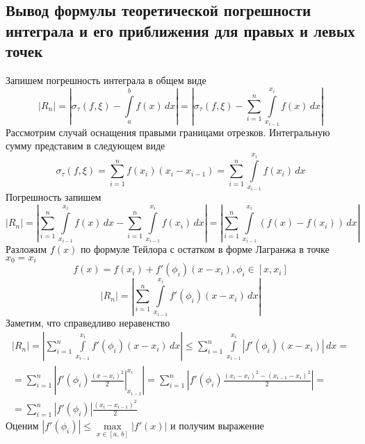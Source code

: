 \documentclass[a5paper, 10pt]{article}
\theoremstyle{definition}
\theoremstyle{plain}
\theoremstyle{remark}
\begin{document}
 \subsection{Вывод формулы теоретической погрешности интеграла и его приближения для правых и левых точек}
Запишем погрешность интеграла в общем виде
\begin{equation}
\left|R_n\right| = \left| \sigma_\tau (f, \xi) - \int\limits_a^b f(x) \,dx \right| =  \left| \sigma_{\tau} (f, \xi) - \sum\limits_{i=1}^n \int\limits_{x_{i-1}}^{x_{i}} f(x) \,dx \right|
\end{equation}
Рассмотрим случай оснащения правыми границами отрезков. Интегральную сумму представим в следующем виде
\begin{equation}
\sigma_\tau (f, \xi) = \sum\limits_{i=1}^n f(x_{i})(x_{i} - x_{i-1}) = \sum\limits_{i=1}^n \int\limits_{x_{i-1}}^{x_{i}} f(x_{i}) \,dx 
\end{equation}
Погрешность запишем 
\begin{equation}
\left|R_n\right| = \left|\sum\limits_{i=1}^n \int\limits_{x_{i-1}}^{x_{i}} f(x) \,dx - \sum\limits_{i=1}^n \int\limits_{x_{i-1}}^{x_{i}} f(x_{i}) \,dx \right| = \left|\sum\limits_{i=1}^n \int\limits_{x_{i-1}}^{x_{i}} \left( f(x) -  f(x_{i}) \right) \,dx\right|
\end{equation}
Разложим $f(x)$ по формуле Тейлора с остатком в форме Лагранжа в точке $x_0 = x_{i} $
\begin{equation}
f(x) = f(x_{i}) + f'(\phi_i)(x - x_{i}), \phi_i \in [x,  x_i ]
\end{equation}
\begin{equation}
\left|R_n\right| =  \left|\sum\limits_{i=1}^n \int\limits_{x_{i-1}}^{x_{i}}  f'(\phi_i)(x - x_{i})  \,dx\right|
\end{equation}
Заметим, что справедливо неравенство
\begin{multline}
\left|R_n\right| = \left|\sum\limits_{i=1}^n \int\limits_{x_{i-1}}^{x_{i}}  f'(\phi_i)(x - x_{i})  \,dx\right| \leqslant  \sum\limits_{i=1}^n \int\limits_{x_{i-1}}^{x_{i}} \left| f'(\phi_i) (x - x_{i})\right|  \,dx = \\ =\sum\limits_{i=1}^n  \left| f'(\phi_i) \left. \frac{(x - x_{i})^2}{2} \right|_{x_{i-1}}^{x_{i}}\right| = \sum\limits_{i=1}^n  \left| f'(\phi_i)  \frac{(x_{i} - x_{i})^2 - (x_{i-1} - x_{i})^2}{2} \right| = \\ = \sum\limits_{i=1}^n  \left| f'(\phi_i) \right| \frac{ (x_{i} - x_{i-1})^2}{2}
\end{multline}
Оценим $\left| f'(\phi_i)\right| \leqslant\max\limits_{x \in [a,\,b]} \left|f'(x)\right| $ и получим выражение
\end{document}

